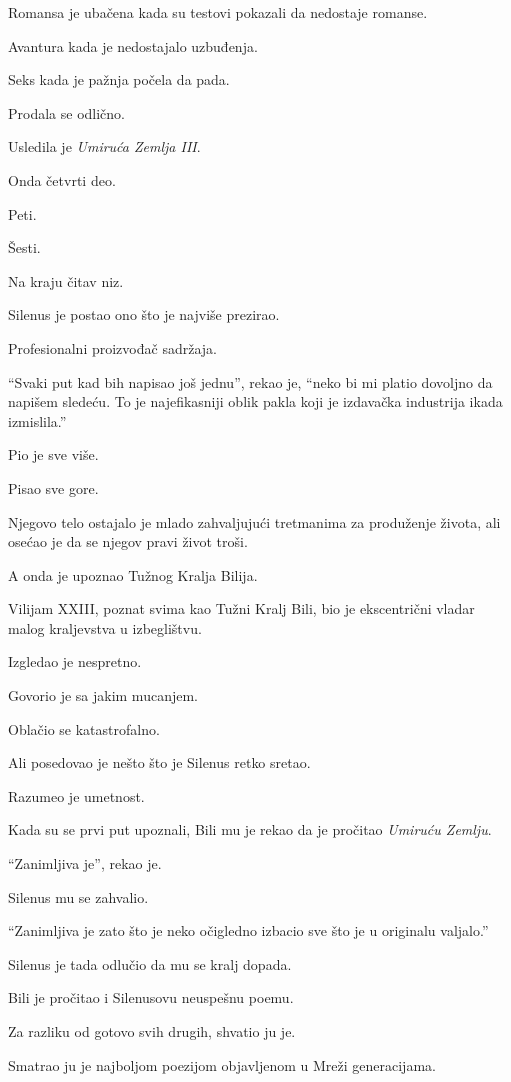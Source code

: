 Romansa je ubačena kada su testovi pokazali da nedostaje romanse.

Avantura kada je nedostajalo uzbuđenja.

Seks kada je pažnja počela da pada.

Prodala se odlično.

Usledila je \emph{Umiruća Zemlja III}.

Onda četvrti deo.

Peti.

Šesti.

Na kraju čitav niz.

Silenus je postao ono što je najviše prezirao.

Profesionalni proizvođač sadržaja.

``Svaki put kad bih napisao još jednu'', rekao je, ``neko bi mi platio dovoljno da napišem sledeću. To je najefikasniji oblik pakla koji je izdavačka industrija ikada izmislila.''

Pio je sve više.

Pisao sve gore.

Njegovo telo ostajalo je mlado zahvaljujući tretmanima za produženje života, ali osećao je da se njegov pravi život troši.

A onda je upoznao Tužnog Kralja Bilija.

\bigskip

Vilijam XXIII, poznat svima kao Tužni Kralj Bili, bio je ekscentrični vladar malog kraljevstva u izbeglištvu.

Izgledao je nespretno.

Govorio je sa jakim mucanjem.

Oblačio se katastrofalno.

Ali posedovao je nešto što je Silenus retko sretao.

Razumeo je umetnost.

Kada su se prvi put upoznali, Bili mu je rekao da je pročitao \emph{Umiruću Zemlju}.

``Zanimljiva je'', rekao je.

Silenus mu se zahvalio.

``Zanimljiva je zato što je neko očigledno izbacio sve što je u originalu valjalo.''

Silenus je tada odlučio da mu se kralj dopada.

Bili je pročitao i Silenusovu neuspešnu poemu.

Za razliku od gotovo svih drugih, shvatio ju je.

Smatrao ju je najboljom poezijom objavljenom u Mreži generacijama.

